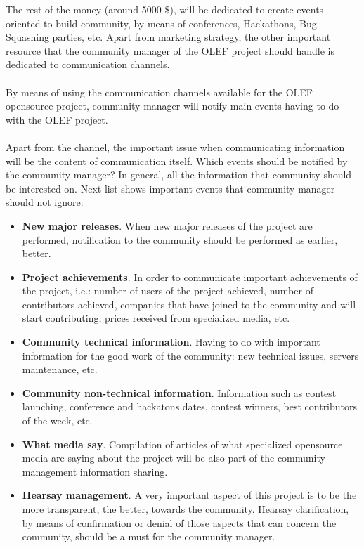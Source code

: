 \documentclass[11pt]{article}
\begin{document}
The rest of the money (around 5000 \$), will be dedicated to create events oriented to build community, by means of conferences, Hackathons, Bug Squashing parties, etc.
Apart from marketing strategy, the other important resource that the community manager of the OLEF project should handle is dedicated to communication channels.\\
\\
By means of using the communication channels available for the OLEF opensource project, community manager will notify main events having to do with the OLEF project.\\
\\
Apart from the channel, the important issue when communicating information will be the content of communication itself. Which events should be notified by the community manager? In general, all the information that community should be interested on. Next list shows important events that community manager should not ignore:
\begin{itemize}\itemsep0pt
\item{\textbf{New major releases}}. When new major releases of the project are performed, notification to the community should be performed as earlier, better.
\item{\textbf{Project achievements}}. In order to communicate important achievements of the project, i.e.: number of users of the project achieved, number of contributors achieved, companies that have joined to the community and will start contributing, prices received from specialized media, etc.
\item{\textbf{Community technical information}}. Having to do with important information for the good work of the community: new technical issues, servers maintenance, etc.
\item{\textbf{Community non-technical information}}. Information such as contest launching, conference and hackatons dates, contest winners, best contributors of the week, etc.
\item{\textbf{What media say}}. Compilation of articles of what specialized opensource media are saying about the project will be also part of the community management information sharing.
\item{\textbf{Hearsay management}}. A very important aspect of this project is to be the more transparent, the better, towards the community. Hearsay clarification, by means of confirmation or denial of those aspects that can concern the community, should be a must for the community manager.
\end{itemize}
\end{document}
